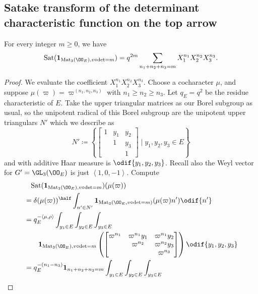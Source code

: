\subsection{Satake transform of the determinant characteristic function on the top arrow}
\begin{proposition}
  For every integer $m \ge 0$, we have
  \[ \Sat(\mathbf{1}_{\Mat_3(\OO_E), v\circ\det=m})
    = q^{2m} \sum_{n_1 + n_2 + n_3 = m} X_1^{n_1} X_2^{n_2} X_3^{n_3}. \]
\end{proposition}
\begin{proof}
  We evaluate the coefficient $X_1^{n_1} X_2^{n_2} X_3^{n_3}$.
  Choose a cocharacter $\mu$,
  and suppose $\mu(\varpi) = \varpi^{(n_1, n_2, n_3)}$ with $n_1 \ge n_2 \ge n_3$.
  Let $q_E = q^2$ be the residue characteristic of $E$.
  Take the upper triangular matrices as our Borel subgroup as usual,
  so the unipotent radical of this Borel subgroup
  are the unipotent upper triangulars $N'$ which we describe as
  \[ N' \coloneqq \left\{ \begin{bmatrix}
      1 & y_1 & y_2 \\
        & 1 & y_3 \\
        &   & 1 \end{bmatrix} \mid y_1, y_2, y_3 \in E \right\} \]
  and with additive Haar measure is $\odif{y_1,y_2,y_3}$.
  Recall also the Weyl vector for $G' = \GL_3(\OO_E)$ is just $\left< 1,0,-1\right>$.
  Compute
  \begin{align*}
    &\phantom=\Sat(\mathbf{1}_{\Mat_3(\OO_E), v\circ\det=m})(\mu(\varpi)) \\
    &= \delta(\mu(\varpi))^\half \int_{n' \in N'}
      \mathbf{1}_{\Mat_3(\OO_E, v\circ \det = m)} (\mu(\varpi) n') \odif{n'} \\
    &= q_E^{-\left< \mu, \rho\right>} \int_{y_1 \in E} \int_{y_2 \in E} \int_{y_3 \in E} \\
    &\qquad
      \mathbf{1}_{\Mat_3(\OO_E), v \circ \det = m}
      \left(
        \begin{bmatrix}
          \varpi^{n_1} & \varpi^{n_1} y_1 & \varpi^{n_1} y_2 \\
          & \varpi^{n_2} & \varpi^{n_2} y_3 \\
          & & \varpi^{n_3} \\
        \end{bmatrix}
      \right) \odif{y_1,y_2,y_3} \\
    &= q_E^{-(n_1-n_3)} \mathbf{1}_{n_1+n_2+n_3=m}
    \int_{y_1 \in E} \int_{y_2 \in E} \int_{y_3 \in E} \\

\end{align*}
\end{proof}
